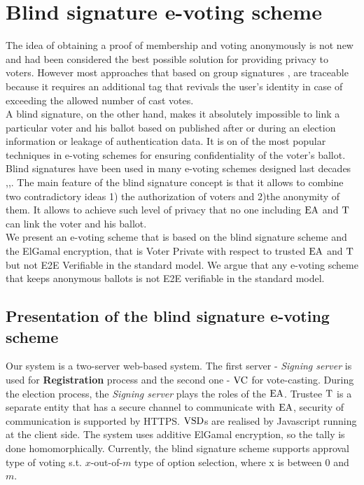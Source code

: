 \chapter{Blind signature e-voting scheme}
The idea of obtaining a proof of membership and voting anonymously is not new and had been considered the best possible solution for providing privacy to voters. However most approaches that based on group signatures \cite{Teranishi2009},\cite{Au2013} are traceable because it requires an additional tag that revivals the user's identity in case of exceeding the allowed number of cast votes.\\

A blind signature, on the other hand, makes it absolutely impossible to link a particular voter and his ballot based on published after or during an election information or leakage of authentication data.  It is on of the most popular techniques in e-voting schemes for ensuring confidentiality of the voter's ballot. Blind signatures have been used in many e-voting schemes designed last decades \cite{Ion2011},\cite{Ibrahim2003},\cite{Fujioka1993}. The main feature of the blind signature concept is that it allows to combine two contradictory ideas 1) the authorization of voters and 2)the anonymity of them. It allows to achieve such level of privacy that no one including $\operatorname{EA}$ and $\operatorname{T}$ can link the voter and his ballot. \\

We present an e-voting scheme that is based on the blind signature scheme and the ElGamal encryption, that is Voter Private with respect to trusted $\operatorname{EA}$ and $\operatorname{T}$ but not E2E Verifiable in the standard model. We argue that any e-voting scheme that keeps anonymous ballots is not E2E verifiable in the standard model.
\section{Presentation of the blind signature e-voting scheme}
Our system is a two-server web-based system. The first server - \textit{Signing server}  is used for \textbf{Registration} process and the second one  - \textit{$\operatorname{VC}$} for vote-casting. During the election process, the \textit{Signing server} plays the roles of the $\operatorname{EA}$. Trustee $\operatorname{T}$ is a separate entity that has a secure channel to communicate with $\operatorname{EA}$, security of communication is supported by HTTPS. $\operatorname{VSD}$s are realised by Javascript running at the client side. The system uses additive ElGamal encryption, so the tally is done homomorphically. Currently, the blind signature  scheme supports approval type of voting s.t. $x$-out-of-$m$ type of option selection, where x is between 0 and $m$.
